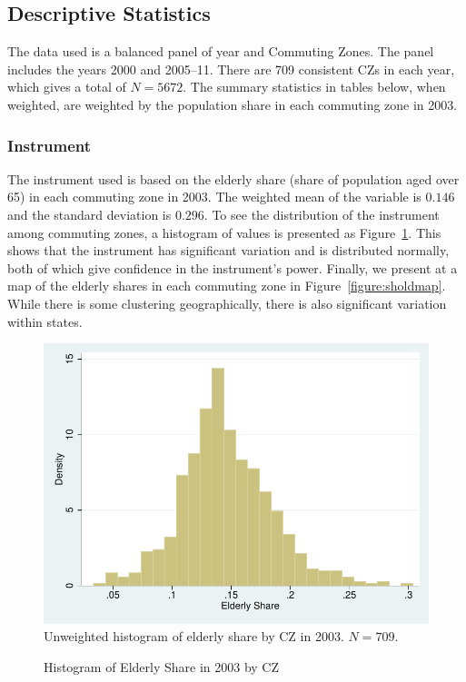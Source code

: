 \documentclass[12pt]{article}
\begin{document}
\subsection{Descriptive Statistics}
The data used is a balanced panel of year and Commuting Zones.  The panel includes the years 2000 and 2005--11.  There are 709 consistent CZs in each year, which gives a total of $N=5672$.  The summary statistics in tables below, when weighted, are weighted by the population share in each commuting zone in 2003.

\subsubsection{Instrument}
The instrument used is based on the elderly share (share of population aged over 65) in each commuting zone in 2003.  The weighted mean of the variable is $0.146$ and the standard deviation is $0.296$.  
To see the distribution of the instrument among commuting zones, a histogram of values is presented as Figure~\ref{figure:sholdhist}.  This shows that the instrument has significant variation and is distributed normally, both of which give confidence in the instrument's power.  Finally, we present at a map of the elderly shares in each commuting zone in Figure~\ref{figure:sholdmap}.  While there is some clustering geographically, there is also significant variation within states.

\begin{figure}[htbp]
    \centering
    \caption{Histogram of Elderly Share in 2003 by CZ}
    \begin{minipage}{0.8\textwidth}
    \includegraphics[width=\textwidth]{figs/hist_shold.pdf}
    \footnotesize
    Unweighted histogram of elderly share by CZ in 2003. $N=709$.
    \end{minipage}
    \label{figure:sholdhist}
\end{figure}
\end{document}
